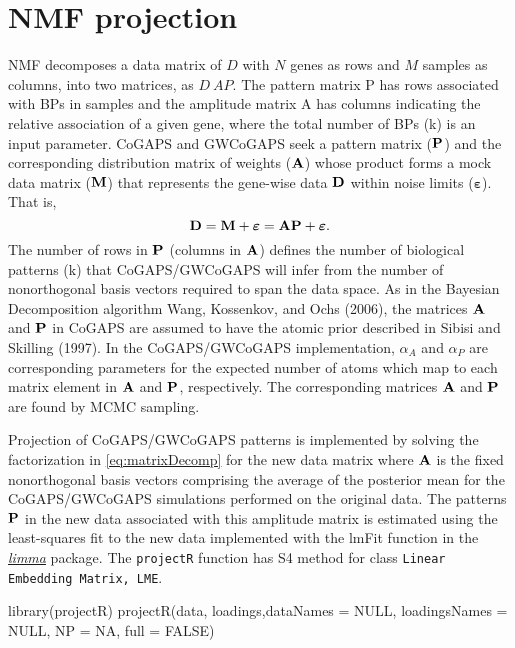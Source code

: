 \documentclass[]{article}
\renewenvironment{verbatim}{\color{codecolor}\begin{myshaded}\begin{oldverbatim}}{\end{oldverbatim}\end{myshaded}}
\begin{document}
\hypertarget{nmf-projection}{%
\section{NMF projection}\label{nmf-projection}}

NMF decomposes a data matrix of \(D\) with \(N\) genes as rows and \(M\) samples as columns, into two matrices, as \(D ~ AP\). The pattern matrix P has rows associated with BPs in samples and the amplitude matrix A has columns indicating the relative association of a given gene, where the total number of BPs (k) is an input parameter. CoGAPS and GWCoGAPS seek a pattern matrix (\({\bf{P}}\)) and the corresponding distribution matrix of weights (\({\bf{A}}\)) whose product forms a mock data matrix (\({\bf{M}}\)) that represents the gene-wise data \({\bf{D}}\) within noise limits (\(\boldsymbol{\varepsilon}\)). That is,
\begin{equation}
{\bf{D}} = {\bf{M}} + \boldsymbol{\varepsilon} = {\bf{A}}{\bf{P}} + \boldsymbol{\varepsilon}.
\label{eq:matrixDecomp}
\end{equation}
The number of rows in \({\bf{P}}\) (columns in \({\bf{A}}\)) defines the number of biological patterns (k) that CoGAPS/GWCoGAPS will infer from the number of nonorthogonal basis vectors required to span the data space. As in the Bayesian Decomposition algorithm Wang, Kossenkov, and Ochs (2006), the matrices \({\bf{A}}\) and \({\bf{P}}\) in CoGAPS are assumed to have the atomic prior described in Sibisi and Skilling (1997). In the CoGAPS/GWCoGAPS implementation, \(\alpha_{A}\) and \(\alpha_{P}\) are corresponding parameters for the expected number of atoms which map to each matrix element in \({\bf{A}}\) and \({\bf{P}}\), respectively. The corresponding matrices \({\bf{A}}\) and \({\bf{P}}\) are found by MCMC sampling.

Projection of CoGAPS/GWCoGAPS patterns is implemented by solving the factorization in \ref{eq:matrixDecomp} for the new data matrix where \({\bf{A}}\) is the fixed nonorthogonal basis vectors comprising the average of the posterior mean for the CoGAPS/GWCoGAPS simulations performed on the original data. The patterns \({\bf{P}}\) in the new data associated with this amplitude matrix is estimated using the least-squares fit to the new data implemented with the lmFit function in the \emph{\href{https://bioconductor.org/packages/3.12/limma}{limma}} package. The \texttt{projectR} function has S4 method for class \texttt{Linear Embedding Matrix, LME}.

\begin{verbatim}
library(projectR)
projectR(data, loadings,dataNames = NULL, loadingsNames = NULL,
     NP = NA, full = FALSE)
\end{verbatim}
\end{document}

